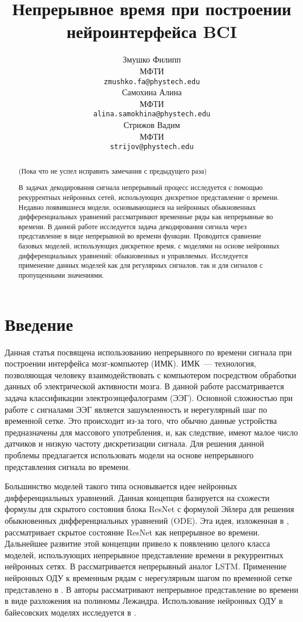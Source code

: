 \documentclass{article}
\title{Непрерывное время при построении нейроинтерфейса BCI}
\author{ Змушко Филипп \\
	МФТИ \\
	\texttt{zmushko.fa@phystech.edu} \\
	\And
	Самохина Алина \\
	МФТИ\\
	\texttt{alina.samokhina@phystech.edu} \\
	\And
	Стрижов Вадим \\
	МФТИ\\
	\texttt{strijov@phystech.edu} \\
}
\date{}
\begin{document}
\maketitle

\begin{abstract}

(Пока что не успел исправить замечания с предыдущего раза)



	В задачах декодирования сигнала непрерывный процесс исследуется с помощью рекуррентных нейронных сетей, использующих дискретное представление о времени. Недавно появившиеся модели, основывающиеся на нейронных обыкновенных дифференциальных уравнений рассматривают временные ряды как непрерывные во времени.
    В данной работе исследуется задача декодирования сигнала через представление в виде непрерывной во времени функции. Проводится сравнение базовых моделей, использующих дискретное время, с моделями на основе нейронных дифференциальных уравнений: обыкновенных и управляемых. Исследуется применение данных моделей как для регулярных сигналов, так и для сигналов с пропущенными значениями. 
\end{abstract}



\section{Введение}
Данная статья посвящена  использованию непрерывного по времени сигнала при построении интерфейса мозг-компьютер (ИМК). ИМК~--- технология, позволяющая человеку взаимодействовать с компьютером посредством обработки данных об электрической активности мозга. В данной работе рассматривается задача классификации электроэнцефалограмм (ЭЭГ). Основной сложностью при работе с сигналами ЭЭГ является зашумленность и нерегулярный шаг по временной сетке. Это происходит из-за того, что обычно данные устройства предназначены для массового употребления, и, как следствие, имеют малое число датчиков и низкую частоту дискретизации сигнала. Для решения данной проблемы предлагается использовать модели на основе непрерывного представления сигнала во времени.

Большинство моделей такого типа основывается идее нейронных дифференциальных уравнений. Данная концепция базируется на схожести формулы для скрытого состояния блока ResNet с формулой Эйлера для решения обыкновенных дифференциальных уравнений (ODE). Эта идея, изложенная в \cite{NEURIPS2018_69386f6b}, рассматривает скрытое состояние ResNet как непрерывное во времени. Дальнейшее развитие этой концепции привело к появлению целого класса моделей, использующих непрерывное представление времени в рекуррентных нейронных сетях. В \cite{lechner2020longterm} рассматривается непрерывный аналог LSTM. Применение нейронных ОДУ к временным рядам с нерегулярным шагом по временной сетке представлено в \cite{cde}. В \cite{NEURIPS2019_952285b9} авторы рассматривают непрерывное представление во времени в виде разложения на полиномы Лежандра. Использование нейронных ОДУ в байесовских моделях исследуется в \cite{NEURIPS2019_99a40143}. 
\end{document}

